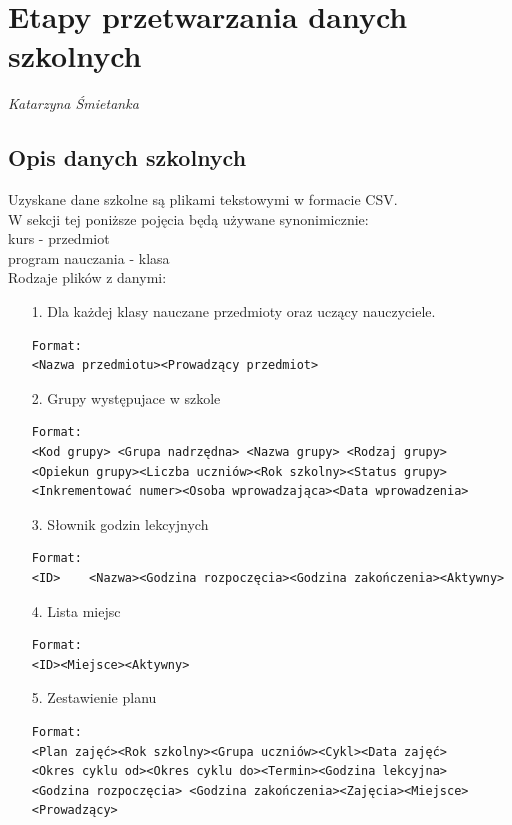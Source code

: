 
\chapter{Etapy przetwarzania danych szkolnych}
\textit{Katarzyna Śmietanka}
\section{Opis danych szkolnych}
Uzyskane dane szkolne są plikami tekstowymi w formacie CSV. \\
W sekcji tej poniższe pojęcia będą używane synonimicznie: \\
kurs - przedmiot \\
program nauczania - klasa \\
Rodzaje plików z danymi:
\begin{enumerate}
\item[1.] Dla każdej klasy nauczane przedmioty oraz uczący nauczyciele.
\begin{verbatim}
Format:
<Nazwa przedmiotu><Prowadzący przedmiot>
\end{verbatim}
\item[2.] Grupy występujace w szkole
\begin{verbatim}
Format:
<Kod grupy> <Grupa nadrzędna> <Nazwa grupy> <Rodzaj grupy> 
<Opiekun grupy><Liczba uczniów><Rok szkolny><Status grupy>
<Inkrementować numer><Osoba wprowadzająca><Data wprowadzenia>
\end{verbatim}
\item[3.] Słownik godzin lekcyjnych
\begin{verbatim}
Format:
<ID>	<Nazwa><Godzina rozpoczęcia><Godzina zakończenia><Aktywny>
\end{verbatim}
\item[4.] Lista miejsc
\begin{verbatim}
Format:
<ID><Miejsce><Aktywny>
\end{verbatim}
\item[5.] Zestawienie planu
\begin{verbatim}
Format:
<Plan zajęć><Rok szkolny><Grupa uczniów><Cykl><Data zajęć>
<Okres cyklu od><Okres cyklu do><Termin><Godzina lekcyjna>
<Godzina rozpoczęcia> <Godzina zakończenia><Zajęcia><Miejsce><Prowadzący>
\end{verbatim}
\end{enumerate}
